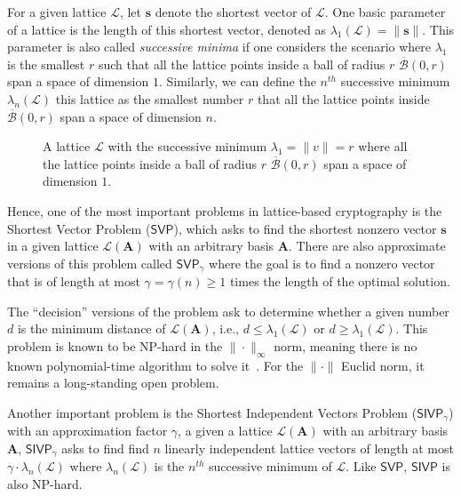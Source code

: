 \documentclass[cryptography,review,submit,pdftex,moreauthors,amsmath,amssymb,aps,strict]{Definitions/mdpi}
\begin{document}
For a given lattice $\mathcal{L}$, let $\mathbf{s}$ denote the shortest vector of $\mathcal{L}$. One basic parameter of a lattice is the length of this shortest vector, denoted as $\lambda_1(\mathcal{L}) = \|\mathbf{s}\|$. This parameter is also called \textit{successive minima} if one considers the scenario where $\lambda_1$ is the smallest $r$ such that all the lattice points inside a ball of radius $r$ $\overline{\mathcal{B}}(0,r)$ span a space of dimension $1$. Similarly, we can define the $n^{th}$ successive minimum $\lambda_n(\mathcal{L})$ this lattice as the smallest number $r$ that all the lattice points inside $\overline{\mathcal{B}}(0,r)$ span a space of dimension $n$. 

\begin{figure}[!htb]
    \centering
    
    \caption{A lattice $\mathcal{L}$ with the successive minimum $\lambda_1=\|v\|=r$ where all the lattice points inside a ball of radius $r$ $\overline{\mathcal{B}}(0,r)$ span a space of dimension $1$.}
    \label{fig:lattice_sucessive_minimum}
\end{figure}

Hence, one of the most important problems in lattice-based cryptography is the Shortest Vector Problem ($\mathsf{SVP}$), which asks to find the shortest nonzero vector $\mathbf{s}$ in a given lattice $\mathcal{L}(\mathbf{A})$ with an arbitrary basis $\mathbf{A}$. There are also approximate versions of this problem called $\mathsf{SVP}_{\gamma}$ where the goal is to find a nonzero vector that is of length at most $\gamma = \gamma(n)\geq 1$ times the length of the optimal solution.

The ``decision'' versions of the problem ask to determine whether a given number $d$ is the minimum distance of $\mathcal{L}(\mathbf{A})$, i.e., $d \leq \lambda_1(\mathcal{L})$ or $d \geq \lambda_1(\mathcal{L})$.
This problem is known to be NP-hard in the $\|\cdot\|_{\infty}$ norm, meaning there is no known polynomial-time algorithm to solve it~\cite{hardness_of_SVP}. For the $\|\cdot\|$ Euclid norm, it remains a long-standing open problem. 

Another important problem is the Shortest Independent Vectors Problem ($\mathsf{SIVP}_{\gamma}$) with an approximation factor $\gamma$, a given a lattice $\mathcal{L}(\mathbf{A})$ with an arbitrary basis $\mathbf{A}$, $\mathsf{SIVP}_{\gamma}$ asks to find find $n$ linearly independent lattice vectors of length at most $\gamma\cdot \lambda_{n}(\mathcal{L})$ where $\lambda_{n}(\mathcal{L})$ is the $n^{th}$ successive minimum of $\mathcal{L}$. Like $\mathsf{SVP}$, $\mathsf{SIVP}$ is also NP-hard.
\end{document}
